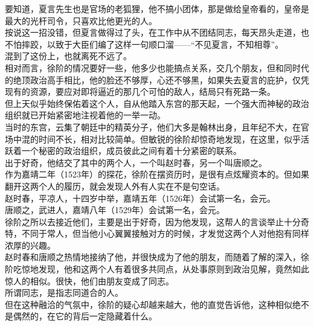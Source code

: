 \begin{multicols}{\theparacolNo}
要知道，夏言先生也是官场的老狐狸，他不搞小团体，那是做给皇帝看的，皇帝是最大的光杆司令，只喜欢比他更光的人。\\

按说这一招没错，但夏言做得过了头，在工作中从不团结同志，每天昂头走道，也不怕摔跤，以致于大臣们编了这样一句顺口溜——“不见夏言，不知相尊”。\\

混到了这份上，也就离死不远了。\\

相对而言，徐阶的情况要好一些，他多少也能搞点关系，交几个朋友，但和同时代的绝顶政治高手相比，他的脸还不够厚，心还不够黑，如果失去夏言的庇护，仅凭现有的资源，要应对即将逼近的那几个可怕的敌人，结局只有死路一条。\\

但上天似乎始终保佑着这个人，自从他踏入东宫的那天起，一个强大而神秘的政治组织就已开始紧密地注视着他的一举一动。\\

当时的东宫，云集了朝廷中的精英分子，他们大多是翰林出身，且年纪不大，在官场中混的时间不长，相对比较简单。但敏锐的徐阶却惊奇地发现，在这里，似乎活跃着一个秘密的政治组织，成员彼此之间有着十分紧密的联系。\\

出于好奇，他结交了其中的两个人，一个叫赵时春，另一个叫唐顺之。\\

作为嘉靖二年（1523年）的探花，徐阶在摆资历时，是很有点炫耀资本的。但如果翻开这两个人的履历，就会发现人外有人实在不是句空话。\\

赵时春，平凉人，十四岁中举，嘉靖五年（1526年）会试第一名，会元。\\

唐顺之，武进人，嘉靖八年（1529年）会试第一名，会元。\\

徐阶之所以去接近他们，主要是出于好奇，因为他发现，这帮人的言谈举止十分奇特，不同于常人，但当他小心翼翼接触对方的时候，才发觉这两个人对他抱有同样浓厚的兴趣。\\

赵时春和唐顺之热情地接纳了他，并很快成为了他的朋友，而随着了解的深入，徐阶吃惊地发现，他和这两个人有着很多共同点，从处事原则到政治见解，竟然如此惊人的相似。很快，他们由朋友变成了同志。\\

所谓同志，是指志同道合的人。\\

但在这种融洽的气氛中，徐阶的疑心却越来越大，他的直觉告诉他，这种相似绝不是偶然的，在它的背后一定隐藏着什么。\\


\end{multicols}
